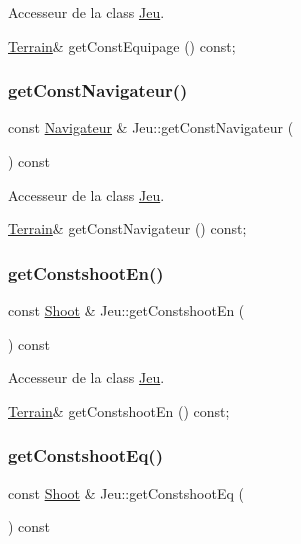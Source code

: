 Accesseur de la class \hyperlink{class_jeu}{Jeu}. 

\hyperlink{class_terrain}{Terrain}\& get\+Const\+Equipage () const; \mbox{\label{class_jeu_af2d070e73c6c9bd9dc3cf09d110a82eb}} 
\subsubsection{\texorpdfstring{get\+Const\+Navigateur()}{getConstNavigateur()}}
{\footnotesize\ttfamily const \hyperlink{class_navigateur}{Navigateur} \& Jeu\+::get\+Const\+Navigateur (\begin{DoxyParamCaption}{ }\end{DoxyParamCaption}) const}



Accesseur de la class \hyperlink{class_jeu}{Jeu}. 

\hyperlink{class_terrain}{Terrain}\& get\+Const\+Navigateur () const; \mbox{\label{class_jeu_ae864beb5c3c85c1d152dedf39c838254}} 
\subsubsection{\texorpdfstring{get\+Constshoot\+En()}{getConstshootEn()}}
{\footnotesize\ttfamily const \hyperlink{class_shoot}{Shoot} \& Jeu\+::get\+Constshoot\+En (\begin{DoxyParamCaption}{ }\end{DoxyParamCaption}) const}



Accesseur de la class \hyperlink{class_jeu}{Jeu}. 

\hyperlink{class_terrain}{Terrain}\& get\+Constshoot\+En () const; \mbox{\label{class_jeu_ac305ed7d05845e93da364408ddf23f7a}} 
\subsubsection{\texorpdfstring{get\+Constshoot\+Eq()}{getConstshootEq()}}
{\footnotesize\ttfamily const \hyperlink{class_shoot}{Shoot} \& Jeu\+::get\+Constshoot\+Eq (\begin{DoxyParamCaption}{ }\end{DoxyParamCaption}) const}



